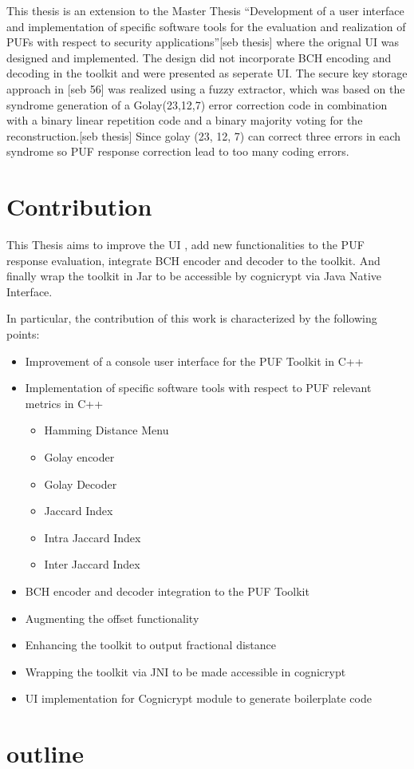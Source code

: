 This thesis is an extension to the Master Thesis ``Development of a user interface and implementation of specific software tools for the evaluation and realization of PUFs with respect to security applications''[seb thesis]	where the orignal UI was designed and implemented. The design did not incorporate BCH encoding and decoding in the toolkit and were presented as seperate UI. The secure key storage approach in [seb 56] was realized using a fuzzy extractor, which was based on the syndrome generation of a Golay(23,12,7) error correction code in combination with a binary linear repetition code and a binary majority voting for the reconstruction.[seb thesis]  Since golay (23, 12, 7) can correct three errors in each syndrome so PUF response correction lead to too many coding errors.

\section{Contribution}
This Thesis aims to improve the UI , add new functionalities to the PUF response evaluation, integrate BCH encoder and decoder to the toolkit.
And finally wrap the toolkit in Jar to be accessible by cognicrypt via Java Native Interface.

In particular, the contribution of this work is characterized by the following points:

\begin{itemize}
	\item Improvement of a console user interface for the PUF Toolkit in C++
	\item Implementation of specific software tools with respect to PUF relevant metrics in C++
		\begin{itemize}
			\item Hamming Distance Menu
			\item Golay encoder 
			\item Golay Decoder
			\item Jaccard Index 
			\item Intra Jaccard Index
			\item Inter Jaccard Index
		\end{itemize}
	\item BCH encoder and decoder integration to the PUF Toolkit
	\item Augmenting the offset functionality
	\item Enhancing the toolkit to output fractional distance
	\item Wrapping the toolkit via JNI to be made accessible in cognicrypt
	\item UI implementation for Cognicrypt module to generate boilerplate code
\end{itemize}

\section{outline} %
